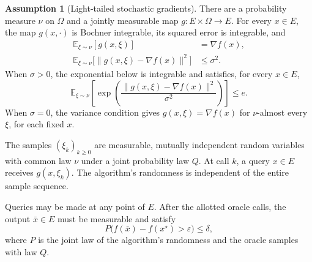 \documentclass[10pt]{article}
\theoremstyle{definition}
\newtheorem{assumption}{Assumption}
\begin{document}
\begin{assumption}[Light-tailed stochastic gradients]
There are a probability measure $\nu$ on $\Omega$ and a jointly measurable map $g:E\times\Omega\to E$. For every $x\in E$, the map $g(x,\cdot)$ is Bochner integrable, its squared error is integrable, and
\[
\begin{aligned}
\mathbb{E}_{\xi\sim\nu}[g(x,\xi)]&=\nabla f(x),\\
\mathbb{E}_{\xi\sim\nu}\bigl[\|g(x,\xi)-\nabla f(x)\|^2\bigr]&\leq\sigma^2.
\end{aligned}
\]
When $\sigma>0$, the exponential below is integrable and satisfies, for every $x\in E$,
\[
\mathbb{E}_{\xi\sim\nu}\left[
\exp\left(\frac{\|g(x,\xi)-\nabla f(x)\|^2}{\sigma^2}\right)
\right]\leq e.
\]
When $\sigma=0$, the variance condition gives $g(x,\xi)=\nabla f(x)$ for $\nu$-almost every $\xi$, for each fixed $x$.

The samples $(\xi_k)_{k\geq0}$ are measurable, mutually independent random variables with common law $\nu$ under a joint probability law $Q$. At call $k$, a query $x\in E$ receives $g(x,\xi_k)$. The algorithm's randomness is independent of the entire sample sequence.
\end{assumption}

Queries may be made at any point of $E$. After the allotted oracle calls, the output $\bar{x}\in E$ must be measurable and satisfy
\[
P\bigl(f(\bar{x})-f(x^\star)>\varepsilon\bigr)\leq\delta,
\]
where $P$ is the joint law of the algorithm's randomness and the oracle samples with law $Q$.
\end{document}

